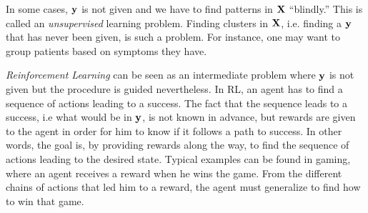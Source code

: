 In some cases, ${\bf y}$ is not given and we have to find patterns in ${\bf X}$
``blindly.'' This is called an \emph{unsupervised} learning problem. Finding
clusters in ${\bf X}$, i.e. finding a ${\bf y}$ that has never been given, is such a
problem. For instance, one may want to group patients based on symptoms they have.

\emph{Reinforcement Learning} can be seen as
an intermediate problem where ${\bf y}$ is not given but the procedure is guided nevertheless. In RL, an agent has
to find a sequence of actions leading to a success. The fact that the sequence
leads to a success, i.e what would be in ${\bf y}$, is not known in advance, but
rewards are given to the agent in order for him to know if it follows a path to
success. In other words, the goal is, by providing rewards along the way, to
find the sequence of actions leading to the desired state. Typical examples can
be found in gaming, where an agent receives a reward when he wins the game. From
the different chains of actions that led him to a reward, the agent must generalize to find how to win that game.
